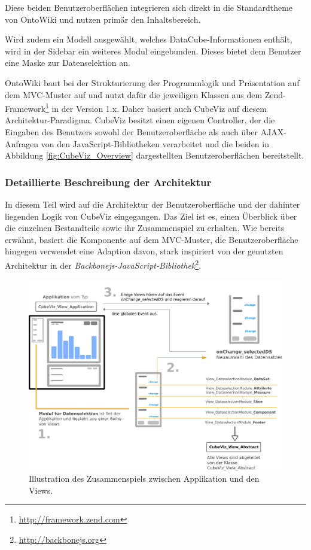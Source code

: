 \documentclass[11pt]{article}
\begin{document}
Diese beiden Benutzeroberflächen integrieren sich direkt in die Standardtheme von OntoWiki und nutzen primär den Inhaltsbereich.


\newpage 
\noindent
Wird zudem ein Modell ausgewählt, welches DataCube-Informationen enthält, wird in der Sidebar ein weiteres Modul eingebunden. Dieses bietet dem Benutzer eine Maske zur Datenselektion an. 

OntoWiki baut bei der Strukturierung der Programmlogik und Präsentation auf dem MVC-Muster auf und nutzt dafür die jeweiligen Klassen aus dem Zend-Framework\footnote{\url{http://framework.zend.com}} in der Version 1.x. Daher basiert auch CubeViz auf diesem Architektur-Paradigma. CubeViz besitzt einen eigenen Controller, der die Eingaben des Benutzers sowohl der Benutzeroberfläche als auch über AJAX-Anfragen von den JavaScript-Bibliotheken verarbeitet und die beiden in Abbildung \ref{fig:CubeViz_Overview} dargestellten Benutzeroberflächen bereitstellt.

%
%
\subsubsection{Detaillierte Beschreibung der Architektur}

In diesem Teil wird auf die Architektur der Benutzeroberfläche und der dahinter liegenden Logik von CubeViz eingegangen. Das Ziel ist es, einen Überblick über die einzelnen Bestandteile sowie ihr Zusammenspiel zu erhalten. Wie bereits erwähnt, basiert die Komponente auf dem MVC-Muster, die Benutzeroberfläche hingegen verwendet eine Adaption davon, stark inspiriert von der genutzten Architektur in der \textit{Backbonejs-JavaScript-Bibliothek}\footnote{\url{http://backbonejs.org}}. \\

%
%
\begin{figure}[h!]
    \centering
    \includegraphics[width=15.5cm]{CubeViz/ApplicationViewInteraction.pdf}
    \caption{Illustration des Zusammenspiels zwischen Applikation und den Views.}
    \label{fig:CubeViz_ApplicationViewInteraction}
\end{figure}
\end{document}

